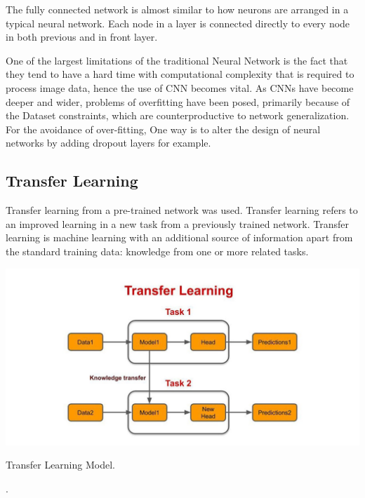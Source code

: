 The fully connected network is almost similar to how neurons are arranged in a typical neural network.
Each node in a layer is connected directly to every node in both previous and in front layer.

One of the largest limitations of the traditional Neural Network is the fact that they tend to have a hard time 
with computational complexity that is required to process image data, hence the use of CNN becomes vital. \cite{o2015introduction}
As CNNs have become deeper and wider, problems of overfitting have been posed, primarily because of the
Dataset constraints, which are counterproductive to network generalization. For the avoidance of over-fitting,
One way is to alter the design of neural networks by adding dropout layers for example.


\subsection{Transfer Learning}
Transfer learning from a pre-trained network was used.
Transfer learning refers to an improved learning in a new task from a previously trained network. 
Transfer learning is machine learning with an additional source of information
apart from the standard training data: knowledge from one or more related tasks.\cite{torrey2010transfer}

\includegraphics[width=.6\textwidth,height=.7\textheight,keepaspectratio]{tex/images/Transfer.jpeg}
\caption{Transfer Learning Model.}
\vspace{5mm}.


